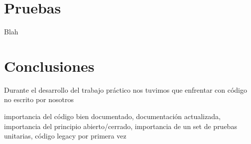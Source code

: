\documentclass[12pt]{article}
\begin{document}
\section{Pruebas}
Blah
	
\section{Conclusiones}
Durante el desarrollo del trabajo práctico nos tuvimos que enfrentar con
código no escrito por nosotros 

importancia del código bien documentado, documentación actualizada, importancia del principio abierto/cerrado, importancia de un
set de pruebas unitarias, código legacy por primera vez
\end{document}
